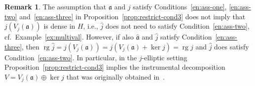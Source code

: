 \documentclass[a4paper,oneside,12pt]{amsart}
\theoremstyle{plain}
\theoremstyle{definition}
\newtheorem{remark}[theorem]{Remark}
\begin{document}
\begin{remark}
The assumption that ${{\mathfrak{{a}}}}$ and $j$ satisfy Conditions~\ref{en:ass-one}, \ref{en:ass-two} and~\ref{en:ass-three} in Proposition~\ref{prop:restrict-cond3} does not imply
that $j(V_j({{\mathfrak{{a}}}}))$ is dense in $H$, i.e., $\hat{j}$ does not need to satisfy Condition~\ref{en:ass-two}, cf.~Example~\ref{ex:multival}. 
However, if also ${{\mathfrak{{\hat{a}}}}}$ and $\hat{j}$ satisfy Condition~\ref{en:ass-three}, then $\operatorname{rg}\hat{j}=j(V_j({{\mathfrak{{a}}}}))=j(V_j({{\mathfrak{{a}}}})+\ker j)=\operatorname{rg} j$ and
$\hat{j}$ does satisfy Condition~\ref{en:ass-two}.
In particular, in the $j$-elliptic setting Proposition~\ref{prop:restrict-cond3} implies the instrumental decomposition $V=V_j({{\mathfrak{{a}}}})\oplus\ker j$ that was originally obtained in~\cite[Theorem~2.5\,(ii)]{AtE12:sect-form}.
\end{remark}
\end{document}

